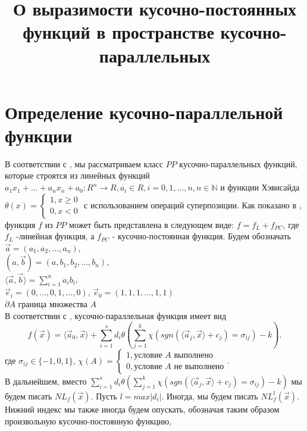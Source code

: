 \documentclass[a4paper]{article}
\theoremstyle{plain}
\theoremstyle{definition}
\begin{document}
\title{О выразимости кусочно-постоянных функций в пространстве кусочно-параллельных}

\section{Определение кусочно-параллельной \\ функции}
В соответствии с \cite{Polov4}, мы рассматриваем класс
$PP$
кусочно-параллельных функций, которые строятся из линейных функций \\
$a_1 x_1+...+a_n x_n+a_0: R^n \to R, a_i\in R, i=0,1,...,n, n\in \mathbb{N}$
и функции Хэвисайда \\
$\theta(x) = \begin{cases} 1, x \geq 0 \\ 0, x< 0 \end{cases}$
с использованием операций суперпозиции.
Как показано в \cite{Polov4}, функция
$f$ из $PP$ может быть представлена в следующем виде:
$f = f_L + f_{PC}$,
где $f_L$ -линейная функция, а
$f_{PC}$ - кусочно-постоянная функция.
Будем обозначать
$\vec{a} = (a_1, a_2, \ldots, a_n)$, \\
$(a, \vec{b}) = (a, b_1, b_2, \ldots, b_n)$,\\
$\langle \vec{a}, \vec{b} \rangle =  \sum_{i = 1}^{n} a_i b_i$,\\
$\vec{e}_i = (0, \ldots, 0, 1, \ldots, 0)$, $\vec{e}_0 = (1, 1, 1, \ldots, 1, 1)$\\
$\partial A$ граница множества $A$\\
В соответствии с \cite{Polov1}, кусочно-параллельная функция имеет вид
\begin{equation}
  f(\vec{x}) = \langle \vec{a}_0, \vec{x} \rangle + \sum_{i = 1}^{s} d_i \theta(\sum_{j = 1}^{k} \chi(sgn(\langle \vec{a}_j, \vec{x} \rangle + c_j) = \sigma_{ij}) - k).
\end{equation}
где
$\sigma_{ij} \in \{-1, 0, 1\}$,
$\chi(A)=\begin{cases} 1, \mbox{условие } A \mbox{ выполнено} \\ 0, \mbox{условие } A \mbox{ не выполнено}  \end{cases}$.\\
В дальнейшем, вместо
$\sum_{i = 1}^{s} d_i \theta(\sum_{j = 1}^{k} \chi(sgn(\langle \vec{a}_j, \vec{x} \rangle + c_j) = \sigma_{ij}) - k)$
мы будем писать
$NL_f(\vec{x})$.
Пусть $l = max |d_i|$.
Иногда, мы будем писать
$NL_{f}^{l}(\vec{x})$.
Нижний индекс мы также иногда будем опускать, обозначая таким образом произвольную кусочно-постоянную функцию,
\end{document}

